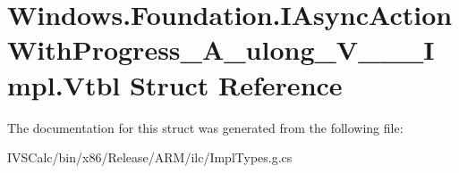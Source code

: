 \hypertarget{struct_windows_1_1_foundation_1_1_i_async_action_with_progress___a__ulong___v_______impl_1_1_vtbl}{}\section{Windows.\+Foundation.\+I\+Async\+Action\+With\+Progress\+\_\+\+A\+\_\+ulong\+\_\+\+V\+\_\+\+\_\+\+\_\+\+Impl.\+Vtbl Struct Reference}
\label{struct_windows_1_1_foundation_1_1_i_async_action_with_progress___a__ulong___v_______impl_1_1_vtbl}


The documentation for this struct was generated from the following file\+:\begin{DoxyCompactItemize}
\item 
I\+V\+S\+Calc/bin/x86/\+Release/\+A\+R\+M/ilc/Impl\+Types.\+g.\+cs\end{DoxyCompactItemize}
